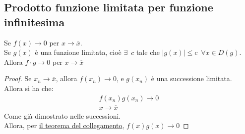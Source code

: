 \documentclass{article}
\theoremstyle{definition}
\begin{document}
\subsection{Prodotto funzione limitata per funzione infinitesima}
Se $f(x) \to 0$ per $x \to \overline{x}$.
\\
Se $g(x)$ è una funzione limitata, cioè $\exists \,\,\, c$ tale che $|g(x)|\leqslant c \,\,\, \forall x \in D(g)$.
\\
Allora $f \cdot g \to 0$ per $x \to \overline{x}$
\begin{proof}
    Se $x_n \to \overline{x}$, allora $f(x_n) \to 0$, e $g(x_n)$ è una successione limitata.
    \\
    Allora si ha che:
    \begin{align}
        f(x_n)g(x_n) \to 0 \\
        x \to \overline{x}
    \end{align}
    Come già dimostrato nelle successioni.
    \\
    Allora, per \underline{il teorema del collegamento}, $f(x)g(x) \to 0$
\end{proof}
\end{document}
